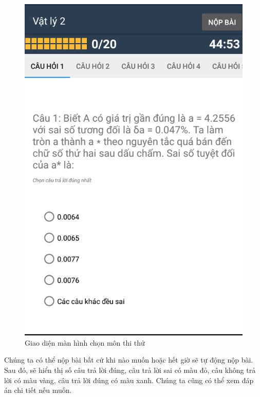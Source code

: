 \documentclass[a4paper]{article}
\begin{document}
\begin{figure}[H]
    \centering
    \includegraphics[scale=.3]{ques_ui.png}
    \caption{Giao diện màn hình chọn môn thi thử}

\end{figure}
Chúng ta có thể nộp bài bất cứ khi nào muốn hoặc hết giờ sẽ tự động nộp bài. Sau đó, sẽ hiển thị số câu trả lời đúng, câu trả lời sai có màu đỏ, câu không trả lời có màu vàng, câu trả lời đúng có màu xanh. Chúng ta cũng có thể xem đáp án chi tiết nếu muốn.
\end{document}
